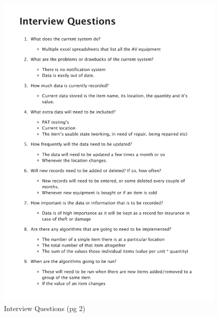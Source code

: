\begin{figure}[H]		
    \caption{Interview Questions (pg 2)} \label{fig: Interview Questions}
    \includegraphics[page=2,width=\textwidth]{./Analysis/Interview/interview_questions.pdf}
\end{figure}		
		
